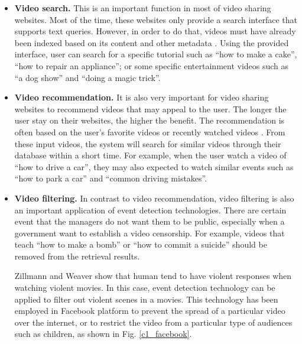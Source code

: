 \begin{itemize}
	\item \textbf{Video search.} This is an important function in most of video sharing websites. Most of the time, these websites only provide a search interface that supports text queries. However, in order to do that, videos must have already been indexed based on its content and other metadata \cite{zhang1997integrated}. Using the provided interface, user can search for a specific tutorial such as ``how to make a cake'',  ``how to repair an appliance''; or some specific entertainment videos such as ``a dog show'' and ``doing a magic trick''.
	\item \textbf{Video recommendation.} It is also very important for video sharing websites to recommend videos that may appeal to the user. The longer the user stay on their websites, the higher the benefit. The recommendation is often based on the user's favorite videos or recently watched videos \cite{davidson2010youtube,mei2007automatic}. From these input videos, the system will search for similar videos through their database within a short time. For example, when the user watch a video of ``how to drive a car'', they may also expected to watch similar events such as ``how to park a car'' and ``common driving mistakes''.
	\item \textbf{Video filtering.} In contrast to video recommendation, video filtering is also an important application of event detection technologies. There are certain event that the managers do not want them to be public, especially when a government want to establish a video censorship. For example, videos that teach ``how to make a bomb'' or ``how to commit a suicide'' should be removed from the retrieval results. 

	Zillmann and Weaver \cite{JASP:JASP145} show that human tend to have violent responses when watching violent movies. In this case, event detection technology can be applied to filter out violent scenes  in a movies. This technology has been employed in Facebook platform \cite{Internet3} to prevent the spread of a particular video over the internet, or to restrict the video from a particular type of audiences such as children, as shown in Fig. \ref{c1_facebook}. 
	

\end{itemize}

